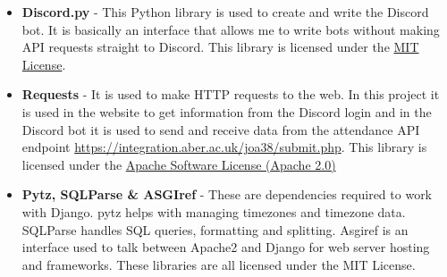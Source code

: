 \begin{itemize}
    \item \textbf{Discord.py} \cite{discord.py} - This Python library is used to create and write the Discord bot. It is basically an interface that allows me to write bots without making API requests straight to Discord. This library is licensed under the \href{https://github.com/Rapptz/discord.py/blob/master/LICENSE}{MIT License}.
    \item \textbf{Requests} \cite{requests} - It is used to make HTTP requests to the web. In this project it is used in the website to get information from the Discord login and in the Discord bot it is used to send and receive data from the attendance API endpoint \href{https://integration.aber.ac.uk/joa38/submit.php}{https://integration.aber.ac.uk/joa38/submit.php}. This library is licensed under the \href{https://pypi.org/project/requests/}{Apache Software License (Apache 2.0)}
    \item \textbf{Pytz, SQLParse \& ASGIref} \cite{pytz} \cite{sqlparse} \cite{asgiref} - These are dependencies required to work with Django. pytz helps with managing timezones and timezone data. SQLParse handles SQL queries, formatting and splitting. Asgiref is an interface used to talk between Apache2 \cite{apache2} and Django \cite{Django} for web server hosting and frameworks. These libraries are all licensed under the MIT License.
\end{itemize}